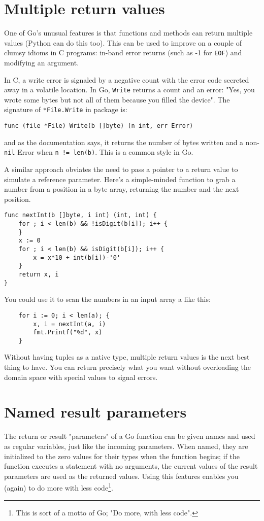 

\section{Multiple return values}
\label{sec:multiple return}
One of Go's unusual features is that functions and methods can return multiple
values (Python can do this too). This can be used to improve on a couple of 
clumsy idioms in C programs:
in-band error returns (such as -1 for \texttt{EOF}) and modifying an argument.

In C, a write error is signaled by a negative count with the error code
secreted away in a volatile location. In Go, \lstinline{Write} returns a count and an
error: "Yes, you wrote some bytes but not all of them because you filled the
device". The signature of \lstinline{*File.Write} in package
 is:
\begin{lstlisting}
func (file *File) Write(b []byte) (n int, err Error)
\end{lstlisting}
and as the documentation says, it returns the number of bytes written and a
non-\lstinline{nil} Error when \lstinline{n != len(b)}. This is a common
style in Go.

A similar approach obviates the need to pass a pointer to a return value to
simulate a reference parameter. Here's a simple-minded function to grab a
number from a position in a byte array, returning the number and the next
position.
\begin{lstlisting}
func nextInt(b []byte, i int) (int, int) {
    for ; i < len(b) && !isDigit(b[i]); i++ {
    }
    x := 0
    for ; i < len(b) && isDigit(b[i]); i++ {
        x = x*10 + int(b[i])-'0'
    }
    return x, i
}
\end{lstlisting}
You could use it to scan the numbers in an input array a like this:
\begin{lstlisting}
    for i := 0; i < len(a); {
        x, i = nextInt(a, i)
        fmt.Printf("%d", x)
    }
\end{lstlisting}
Without having tuples as a native type, multiple return values is the next
best thing to have. You can return precisely what you want without
overloading the domain space with special values to signal errors.

\section{Named result parameters}
\label{sec:named result parameters}
The return or result "parameters" of a Go function can be given names and used
as regular variables, just like the incoming parameters. When named, they are
initialized to the zero values for their types when the function begins; if the
function executes a  statement with no arguments, the current values of
the result parameters are used as the returned values. Using this
features enables you (again) to do more with less code\footnote{This is
sort of a motto of Go; "Do more, with less code".}.

